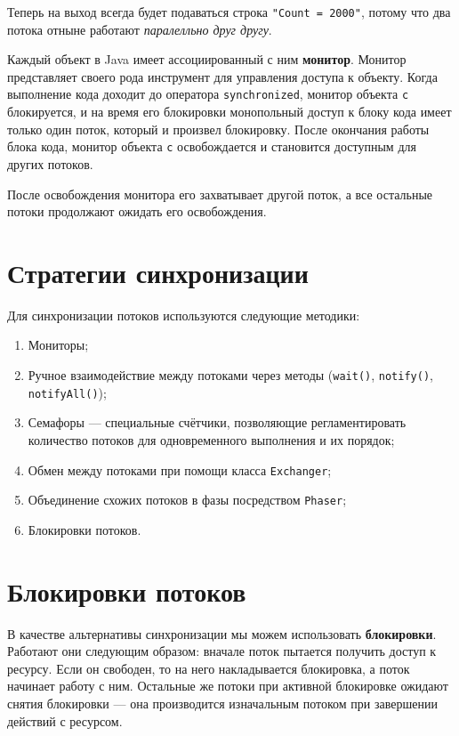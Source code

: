 Теперь на выход всегда будет подаваться строка \verb|"Count = 2000"|, потому что два потока отныне работают \textit{паралелльно друг другу}.

Каждый объект в Java имеет ассоциированный с ним \textbf{монитор}. Монитор представляет своего рода инструмент для управления доступа к объекту. Когда выполнение кода доходит до оператора \verb|synchronized|, монитор объекта \verb|c| блокируется, и на время его блокировки монопольный доступ к блоку кода имеет только один поток, который и произвел блокировку. После окончания работы блока кода, монитор объекта \verb|c| освобождается и становится доступным для других потоков.

После освобождения монитора его захватывает другой поток, а все остальные потоки продолжают ожидать его освобождения.

\section{Стратегии синхронизации}

Для синхронизации потоков используются следующие методики:

\begin{enumerate}
    \item Мониторы;
    \item Ручное взаимодействие между потоками через методы (\verb|wait()|, \verb|notify()|, \verb|notifyAll()|);
    \item Семафоры — специальные счётчики, позволяющие регламентировать количество потоков для одновременного выполнения и их порядок;
    \item Обмен между потоками при помощи класса \verb|Exchanger|;
    \item Объединение схожих потоков в фазы посредством \verb|Phaser|;
    \item Блокировки потоков.
\end{enumerate}

\section{Блокировки потоков}

В качестве альтернативы синхронизации мы можем использовать \textbf{блокировки}. Работают они следующим образом: вначале поток пытается получить доступ к ресурсу. Если он свободен, то на него накладывается блокировка, а поток начинает работу с ним. Остальные же потоки при активной блокировке ожидают снятия блокировки — она производится изначальным потоком при завершении действий с ресурсом.

